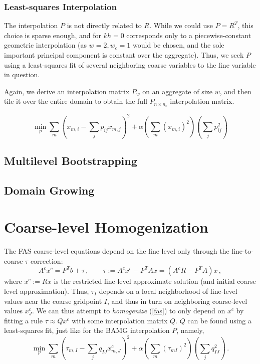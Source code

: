 \documentclass{article}
\begin{document}
\subsubsection{Least-squares Interpolation}
The interpolation $P$ is not directly related to $R$. While we could use $P = R^T$, this choice is sparse enough, and for $kh=0$ corresponds only to a piecewise-constant geometric interpolation (as $w = 2, w_c = 1$ would be chosen, and the sole important principal component is constant over the aggregate). Thus, we seek $P$ using a least-squares fit of several neighboring coarse variables to the fine variable in question.

Again, we derive an interpolation matrix $P_w$ on an aggregate of size $w$, and then tile it over the entire domain to obtain the full $P_{n \times n_c}$ interpolation matrix.

\begin{equation}
	\min_p \sum_m \left( x_{m,i} - \sum_j p_{ij} x_{m,j} \right)^2 + \alpha \left( \sum_m (x_{m,i})^2 \right) \left(\sum_j p_{ij}^2\right) 
\end{equation}

\subsection{Multilevel Bootstrapping}

\subsection{Domain Growing}

\section{Coarse-level Homogenization}
The FAS coarse-level equations depend on the fine level only through the fine-to-coarse $\tau$ correction:
\begin{equation}
	A^c x^c = P^T b + \tau\,,\qquad \tau :=  A^c \overline{x}^c - P^T A x = (A^c R - P^T A) x\,,
	\label{fas}
\end{equation}
where $\overline{x}^c := R x$ is the restricted fine-level approximate solution (and initial coarse level approximation). Thus, $\tau_I$ depends on a local neighborhood of fine-level values near the coarse gridpoint $I$, and thus in turn on neighboring coarse-level values $x^c_J$. We can thus attempt to \emph{homogenize} (\ref{fas}) to only depend on $x^c$  by fitting a rule $\tau \approx Q x^c$ with some interpolation matrix $Q$. $Q$ can be found using a least-squares fit, just like for the BAMG interpolation $P$, namely,
\begin{equation}
	\min_p \sum_m \left( \tau_{m,I} - \sum_j q_{IJ} x^c_{m,J} \right)^2 + \alpha \left( \sum_m (\tau_{mI})^2 \right) \left(\sum_j q_{IJ}^2\right) \,.
\end{equation}
\end{document}
